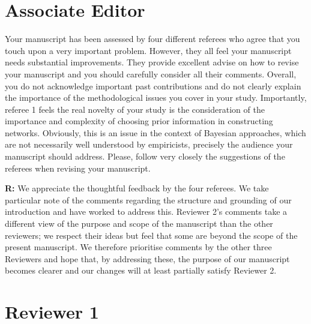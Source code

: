 \section*{Associate Editor}

\begin{refquote}
Your manuscript has been assessed by four different referees who agree that you touch upon a very important problem. However, they all feel your manuscript needs substantial improvements. They provide excellent advise on how to revise your manuscript and you should carefully consider all their comments. Overall, you do not acknowledge important past contributions and do not clearly explain the importance of the methodological issues you cover in your study. Importantly, referee 1 feels the real novelty of your study is the consideration of the importance and complexity of choosing prior information in constructing networks. Obviously, this is an issue in the context of Bayesian approaches, which are not necessarily well understood by empiricists, precisely the audience your manuscript should address. Please, follow very closely the suggestions of the referees when revising your manuscript.

\end{refquote}

\textbf{R:} We appreciate the thoughtful feedback by the four referees. We take particular note of the comments regarding the structure and grounding of our introduction and have worked to address this. Reviewer 2's comments take a different view of the purpose and scope of the manuscript than the other reviewers; we respect their ideas but feel that some are beyond the scope of the present manuscript. We therefore prioritise comments by the other three Reviewers and hope that, by addressing these, the purpose of our manuscript becomes clearer and our changes will at least partially satisfy Reviewer 2.


\section*{Reviewer 1}


